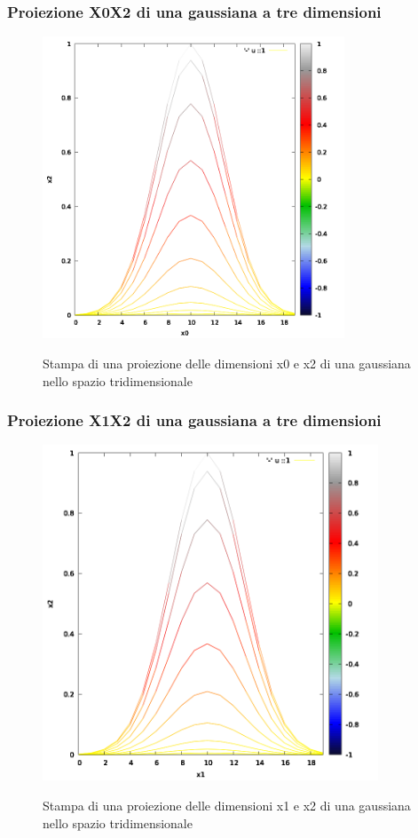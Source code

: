 \documentclass{article}
\begin{document}
\subsubsection{Proiezione X0X2 di una gaussiana a tre dimensioni}

\begin{figure}[H] 
\begin{center}  
  \includegraphics[width=9cm]{test-gnuplot-Gauss3DProjXZ.png}\\ 
  \caption{Stampa di una proiezione delle dimensioni x0 e x2 di una gaussiana nello spazio tridimensionale} 
\end{center} 
\end{figure}

\subsubsection{Proiezione X1X2 di una gaussiana a tre dimensioni}

\begin{figure}[H] 
\begin{center}  
  \includegraphics[width=10cm]{test-gnuplot-Gauss3DProjYZ.png}\\ 
  \caption{Stampa di una proiezione delle dimensioni x1 e x2 di una gaussiana nello spazio tridimensionale} 
\end{center} 
\end{figure}
\end{document}
